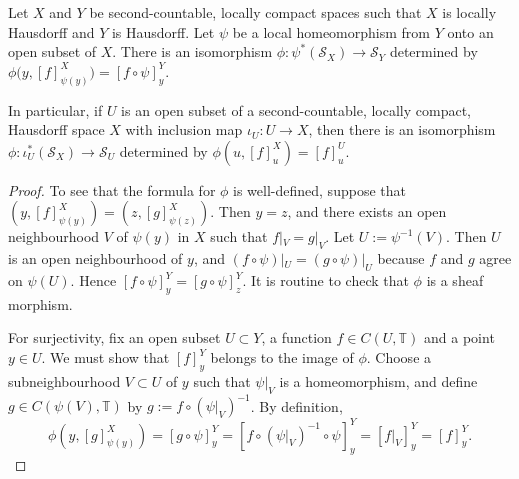 \documentclass[12pt,a4paper]{amsart}
\newcommand{\field}[1]{\mathbb{#1}}
\newcommand{\TT}{\field{T}}
\newcommand{\Tgerms}{\mathcal{S}}
\begin{document}
\begin{lemma}\label{lem:iU(T)=T}
Let $X$ and $Y$ be second-countable, locally compact spaces such
that $X$ is locally Hausdorff and $Y$ is Hausdorff. Let $\psi$
be a local homeomorphism from $Y$ onto an open subset of $X$. There is
an isomorphism $\phi : \psi^*(\Tgerms_{X}) \to \Tgerms_{Y}$
determined by $\phi\big(y, [f]^{X}_{\psi(y)}\big) =
[f\circ\psi]^{Y}_y$.

In particular, if $U$ is an open subset of a second-countable,
locally compact, Hausdorff space $X$ with inclusion map $\iota_U
: U \to X$, then there is an isomorphism $\phi :
\iota^*_U(\Tgerms_X) \to \Tgerms_U$ determined by $\phi(u,
[f]^X_u) = [f]^U_u$.
\end{lemma}
\begin{proof}
To see that the formula for $\phi$ is well-defined, suppose
that $(y, [f]^X_{\psi(y)}) = (z, [g]^X_{\psi(z)})$. Then $y =
z$, and there exists an open neighbourhood $V$ of $\psi(y)$ in
$X$ such that $f|_V = g|_V$. Let $U := \psi^{-1}(V)$. Then $U$
is an open neighbourhood of $y$, and $(f\circ\psi)|_U =
(g\circ\psi)|_U$ because $f$ and $g$ agree on $\psi(U)$. Hence
$[f\circ\psi]^{Y}_y = [g \circ \psi]^Y_z$.  It is routine to
check that $\phi$ is a sheaf morphism.

For surjectivity, fix an open subset $U \subset Y$, a function
$f \in C(U, \TT)$ and a point $y \in U$. We must show that
$[f]^Y_y$ belongs to the image of $\phi$. Choose a
subneighbourhood $V \subset U$ of $y$ such that $\psi|_V$ is a
homeomorphism, and define $g \in C(\psi(V), \TT)$ by $g := f
\circ (\psi|_V)^{-1}$. By definition,
\[
\phi(y, [g]^X_{\psi(y)})
    = [g \circ \psi]^Y_y
    = [f \circ (\psi|_V)^{-1} \circ \psi]^Y_y
    = [f|_V]^Y_y
    = [f]^Y_y.
\]


\end{proof}
\end{document}
